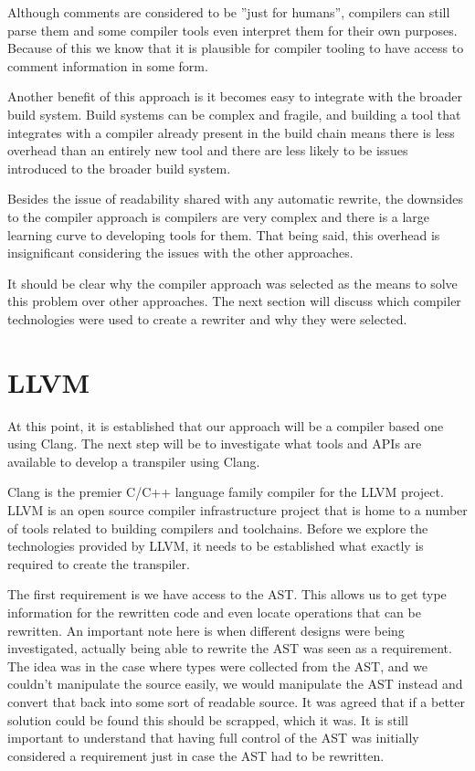 Although comments are considered to be ''just for humans'', compilers can still parse them and some compiler tools even interpret them for their own purposes. Because of this we know that it is plausible for compiler tooling to have access to comment information in some form.

Another benefit of this approach is it becomes easy to integrate with the broader build system. Build systems can be complex and fragile, and building a tool that integrates with a compiler already present in the build chain means there is less overhead than an entirely new tool and there are less likely to be issues introduced to the broader build system.

Besides the issue of readability shared with any automatic rewrite, the downsides to the compiler approach is compilers are very complex and there is a large learning curve to developing tools for them. That being said, this overhead is insignificant considering the issues with the other approaches.

It should be clear why the compiler approach was selected as the means to solve this problem over other approaches. The next section will discuss which compiler technologies were used to create a rewriter and why they were selected.

\section{LLVM}

At this point, it is established that our approach will be a compiler based one using Clang. The next step will be to investigate what tools and APIs are available to develop a transpiler using Clang.

Clang is the premier C/C++ language family compiler for the LLVM project. LLVM is an open source compiler infrastructure project that is home to a number of tools related to building compilers and toolchains. Before we explore the technologies provided by LLVM, it needs to be established what exactly is required to create the transpiler.

The first requirement is we have access to the AST. This allows us to get type information for the rewritten code and even locate operations that can be rewritten. An important note here is when different designs were being investigated, actually being able to rewrite the AST was seen as a requirement. The idea was in the case where types were collected from the AST, and we couldn't manipulate the source easily, we would manipulate the AST instead and convert that back into some sort of readable source. It was agreed that if a better solution could be found this should be scrapped, which it was. It is still important to understand that having full control of the AST was initially considered a requirement just in case the AST had to be rewritten.

